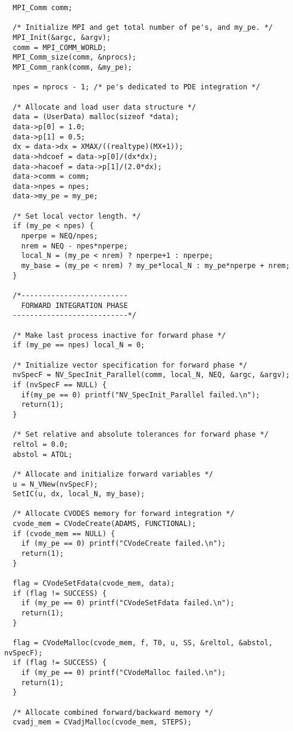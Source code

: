 \begin{verbatim}
  MPI_Comm comm;

  /* Initialize MPI and get total number of pe's, and my_pe. */
  MPI_Init(&argc, &argv);
  comm = MPI_COMM_WORLD;
  MPI_Comm_size(comm, &nprocs);
  MPI_Comm_rank(comm, &my_pe);

  npes = nprocs - 1; /* pe's dedicated to PDE integration */

  /* Allocate and load user data structure */
  data = (UserData) malloc(sizeof *data);
  data->p[0] = 1.0;
  data->p[1] = 0.5;
  dx = data->dx = XMAX/((realtype)(MX+1));
  data->hdcoef = data->p[0]/(dx*dx);
  data->hacoef = data->p[1]/(2.0*dx);
  data->comm = comm;
  data->npes = npes;
  data->my_pe = my_pe;

  /* Set local vector length. */
  if (my_pe < npes) {
    nperpe = NEQ/npes;
    nrem = NEQ - npes*nperpe;
    local_N = (my_pe < nrem) ? nperpe+1 : nperpe;
    my_base = (my_pe < nrem) ? my_pe*local_N : my_pe*nperpe + nrem;
  }

  /*------------------------- 
    FORWARD INTEGRATION PHASE 
  ---------------------------*/

  /* Make last process inactive for forward phase */
  if (my_pe == npes) local_N = 0;

  /* Initialize vector specification for forward phase */
  nvSpecF = NV_SpecInit_Parallel(comm, local_N, NEQ, &argc, &argv);
  if (nvSpecF == NULL) {
    if(my_pe == 0) printf("NV_SpecInit_Parallel failed.\n"); 
    return(1);
  }

  /* Set relative and absolute tolerances for forward phase */
  reltol = 0.0;
  abstol = ATOL;

  /* Allocate and initialize forward variables */
  u = N_VNew(nvSpecF);
  SetIC(u, dx, local_N, my_base);

  /* Allocate CVODES memory for forward integration */
  cvode_mem = CVodeCreate(ADAMS, FUNCTIONAL);
  if (cvode_mem == NULL) { 
    if (my_pe == 0) printf("CVodeCreate failed.\n"); 
    return(1); 
  }

  flag = CVodeSetFdata(cvode_mem, data);
  if (flag != SUCCESS) { 
    if (my_pe == 0) printf("CVodeSetFdata failed.\n"); 
    return(1); 
  }

  flag = CVodeMalloc(cvode_mem, f, T0, u, SS, &reltol, &abstol, nvSpecF);
  if (flag != SUCCESS) { 
    if (my_pe == 0) printf("CVodeMalloc failed.\n"); 
    return(1); 
  }

  /* Allocate combined forward/backward memory */
  cvadj_mem = CVadjMalloc(cvode_mem, STEPS);


\end{verbatim}
